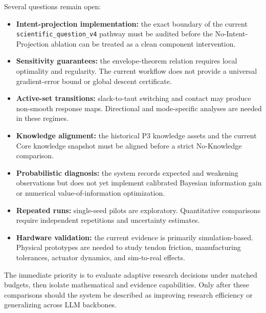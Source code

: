 Several questions remain open:
\begin{itemize}
  \item \textbf{Intent-projection implementation:} the exact boundary of the current \texttt{scientific\_question\_v4} pathway must be audited before the No-Intent-Projection ablation can be treated as a clean component intervention.
  \item \textbf{Sensitivity guarantees:} the envelope-theorem relation requires local optimality and regularity. The current workflow does not provide a universal gradient-error bound or global descent certificate.
  \item \textbf{Active-set transitions:} slack-to-taut switching and contact may produce non-smooth response maps. Directional and mode-specific analyses are needed in these regimes.
  \item \textbf{Knowledge alignment:} the historical P3 knowledge assets and the current Core knowledge snapshot must be aligned before a strict No-Knowledge comparison.
  \item \textbf{Probabilistic diagnosis:} the system records expected and weakening observations but does not yet implement calibrated Bayesian information gain or numerical value-of-information optimization.
  \item \textbf{Repeated runs:} single-seed pilots are exploratory. Quantitative comparisons require independent repetitions and uncertainty estimates.
  \item \textbf{Hardware validation:} the current evidence is primarily simulation-based. Physical prototypes are needed to study tendon friction, manufacturing tolerances, actuator dynamics, and sim-to-real effects.
\end{itemize}

The immediate priority is to evaluate adaptive research decisions under matched budgets, then isolate mathematical and evidence capabilities. Only after these comparisons should the system be described as improving research efficiency or generalizing across LLM backbones.
